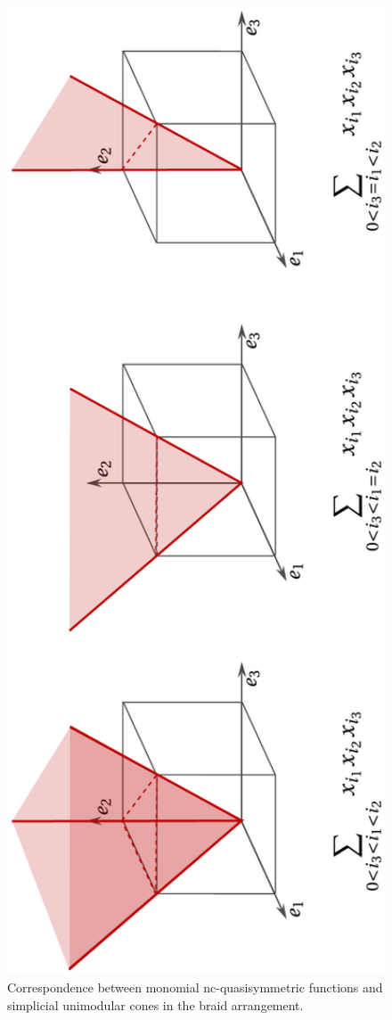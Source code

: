 \documentclass[12pt,reqno]{amsart}
\numberwithin{definition}{section}
\theoremstyle{definition}
\begin{document}
\begin{figure}[h]
\includegraphics[angle=270,width=14cm]{cone}
\caption{\label{fig:cone}Correspondence between monomial nc-quasisymmetric functions and simplicial unimodular cones in the braid arrangement.}
\end{figure}
\end{document}
